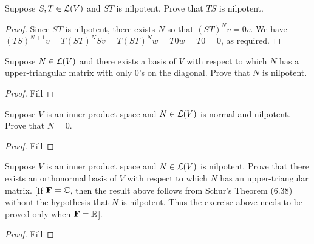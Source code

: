 \begin{exercise}{9}
  Suppose $S,T\in\mathcal{L}(V)$ and $ST$ is nilpotent. Prove that $TS$ is nilpotent.
\end{exercise}
\begin{proof}
 Since $ST$ is nilpotent, there exists $N$ so that $(ST)^Nv =0v$. We have $(TS)^{N+1}v =T(ST)^NSv =T(ST)^Nw =T0w =T0 =0$, as required.
\end{proof}

\begin{exercise}{12}
  Suppose $N\in\mathcal{L}(V)$ and there exists a basis of $V$ with respect to which $N$ has a upper-triangular matrix with only 0's on the diagonal.  Prove that $N$ is nilpotent.
\end{exercise}
\begin{proof}
 Fill
\end{proof}

\begin{exercise}{13}
  Suppose $V$ is an inner product space and $N\in\mathcal{L}(V)$ is normal and nilpotent. Prove that $N=0$.
\end{exercise}
\begin{proof}
 Fill
\end{proof}

\begin{exercise}{14}
  Suppose $V$ is an inner product space and $N\in\mathcal{L}(V)$ is nilpotent. Prove that there exists an orthonormal basis of $V$ with respect to which $N$ has an upper-triangular matrix. [If $\mathbf{F}=\mathbb{C}$, then the result above follows from Schur's Theorem (6.38) without the hypothesis that $N$ is nilpotent. Thus the exercise above needs to be proved only when $\mathbf{F}=\mathbb{R}$].
\end{exercise}
\begin{proof}
 Fill
\end{proof}
